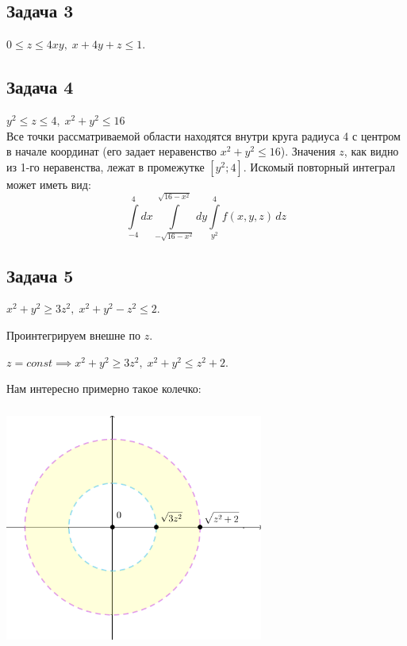 \documentclass[a4paper, fleqn]{article}
\begin{document}
    
    \subsection*{Задача 3}
    
    $0 \leq z \leq 4xy, \; x + 4y + z \leq 1. $
    
    
    \subsection*{Задача 4}
    
    $y^2 \le z \le 4, \; x^2 + y^2 \le 16$\\
    
    Все точки рассматриваемой области находятся внутри круга радиуса 4 с центром в начале координат (его задает неравенство $x^2 + y^2 \le 16$). Значения $z$, как видно из 1-го неравенства, лежат в промежутке $[y^2; 4]$. Искомый повторный интеграл может иметь вид:
    \[ \int\limits_{-4}^{4} dx \int\limits_{-\sqrt{16-x^2}}^{\sqrt{16-x^2}} dy \int\limits_{y^2}^{4} f(x, y, z)\, dz  \]
    
    \subsection*{Задача 5}
    
    $x^2 + y^2 \geq 3 z^2, \; x^2 + y^2 - z^2 \leq 2. $
    
    Проинтегрируем внешне по $z$. 
    
    $z = const \implies x^2 + y^2 \geq 3z^2, \; x^2 + y^2 \leq z^2 + 2.$
    
    Нам интересно примерно такое колечко:
    
    
   \includegraphics[width=8.5cm, height=8cm]{list24imgs/task 2.4.3.png}
    
\end{document}
